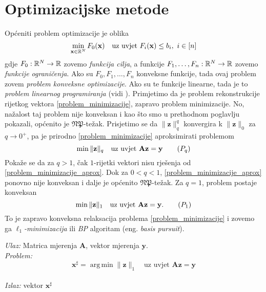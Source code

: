 \documentclass[a4paper,twoside,12pt]{memoir} %
\newcommand{\vect}[1]{\mathbf{#1}}
\renewcommand{\vec}{\vect}
\newcommand{\norm}[1]{\|{#1}\|}
\DeclareMathOperator*{\argmin}{arg\,min}
\newenvironment{alg}[1]
{
    \bigskip
    \begin{tcolorbox}[arc=0mm,boxrule=1.2pt,colframe=black,colback=white,detach title, before upper={\medskip\begin{center}\textbf{#1}\end{center}\hline\newline\medskip},frame hidden]
    \medskip
}
{
    \medskip
\end{tcolorbox}
    \bigskip
}
\begin{document}
\section[Optimizacijske metode][Optimizacijske metode]{Optimizacijske metode}
Op\'ceniti problem optimizacije je oblika
\begin{equation*}
    \min_{\vec x \in \R^N} F_0(\vec x)\quad\text{uz uvjet }F_i(\vec x) \leq b_i,\ i \in [n]
\end{equation*}
gdje $F_0:\mathbb{R}^N \rightarrow \mathbb{R}$ zovemo \textit{funkcija cilja}, a funkcije $F_1, \dots, F_n: \mathbb{R}^N \rightarrow \mathbb{R}$ zovemo \textit{funkcije ograni\v{c}enja}. Ako su $F_0, F_1, \dots, F_n$ konveksne funkcije, tada ovaj problem zovem \textit{problem konveksne optimizacije}. Ako su te funkcije linearne, tada je to \textit{problem linearnog programiranja} (vidi \cite{chong2013introduction}). Primjetimo da je problem rekonstrukcije rijetkog vektora \eqref{problem_minimizacije}, zapravo problem minimizacije. No, na\v{z}alost taj problem nije konveksan i kao \v{s}to smo u prethodnom poglavlju pokazali, op\'cenito je $\mathfrak{NP}$-te\v{z}ak. Prisjetimo se da $\norm{\vec z}_q^q$ konvergira k $\norm{\vec z}_0$ za $q \rightarrow 0^+$, pa je prirodno  \eqref{problem_minimizacije} aproksimirati problemom
\begin{equation}
    \min \norm{\vec z}_q\quad\text{uz uvjet }\vec{Az}=\vec y\tag{$P_{q}$}\label{problem_minimizacije_aprox}
\end{equation}
Poka\v{z}e se da za $q > 1$, \v{c}ak $1$-rijetki vektori nisu rje\v{s}enja od \eqref{problem_minimizacije_aprox}. Dok za $0 < q < 1$, \eqref{problem_minimizacije_aprox} ponovno nije konveksan i dalje je op\'cenito $\mathfrak{NP}$-te\v{z}ak. Za $q=1$, problem postaje konveksan
\begin{equation}
    \min \norm{\vec z}_1 \quad \text{uz uvjet }\vec{Az}=\vec y.\tag{$P_{1}$}\label{problem_minimizacije_l1}
\end{equation}
To je zapravo konveksna relaksacija problema \eqref{problem_minimizacije} i zovemo ga $\ell_1$\textit{-minimizacija} ili \textit{BP} algoritam (eng. \textit{basis pursuit}).

\begin{alg}{$\ell_1$-minimizacija (BP)}
    \textit{Ulaz:} Matrica mjerenja $\vec A$, vektor mjerenja $\vec y$. \\
    \textit{Problem:}
        \begin{equation}
            \vec x^{\sharp} = \argmin \norm{\vec z}_1 \quad \text{uz uvjet }\vec{Az}=\vec y\tag{$\ell_1-min$}\label{algoritam_l1_minimizacija}
        \end{equation} \\
        \textit{Izlaz:} vektor $\vec x^{\sharp}$
\end{alg}
\end{document}
